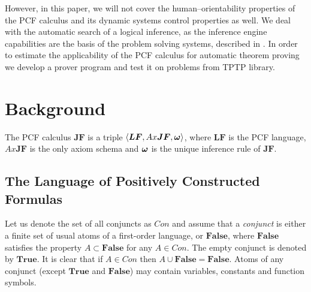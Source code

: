 \documentclass[runningheads,a4paper]{llncs}
\begin{document}
However, in this paper, we will not cover the human--orientability properties of the PCF calculus and its dynamic systems control properties as well. We deal with the automatic search of a logical inference, as the inference engine capabilities are the basis of the problem solving systems, described in \cite{ICDS2000}. In order to estimate the applicability of the PCF calculus for automatic theorem proving we develop a prover program and test it on problems from TPTP library.



\section{Background}


The PCF calculus $\boldsymbol{JF}$ is a triple $\left\langle \boldsymbol{LF}, Ax\boldsymbol{JF}, \boldsymbol{\omega} \right\rangle$, where $\boldsymbol{LF}$ is the PCF language, $Ax\boldsymbol{JF}$ is the only axiom schema and $\boldsymbol{\omega}$ is the unique inference rule of $\boldsymbol{JF}.$

\subsection{The Language of Positively Constructed Formulas}

Let us denote the set of all conjuncts as $Con$ and assume that a {\em conjunct} is either a finite set of usual atoms of a first-order language, or $\boldsymbol{False}$, where $\boldsymbol{False}$ satisfies the property $A \subset \boldsymbol{False} $ for any $A \in Con$. The empty conjunct is denoted by $\boldsymbol{True}$. It is clear that if $A \in Con$ then $A \cup \boldsymbol{False} = \boldsymbol{False}$. Atoms of any conjunct (except $\boldsymbol{True}$ and $\boldsymbol{False}$) may contain variables, constants and function symbols.
\end{document}
